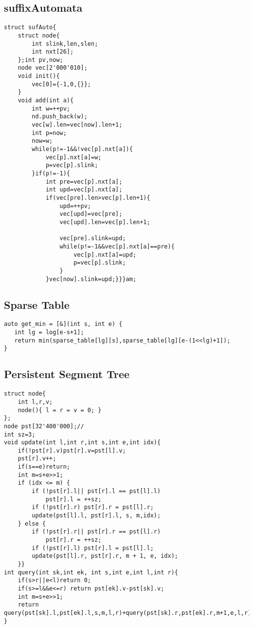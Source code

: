 \documentclass[landscape, 8pt, a4paper, oneside, twocolumn]{extarticle}
\begin{document}
\subsection {suffixAutomata}
\begin{verbatim}
struct sufAuto{
    struct node{
        int slink,len,slen;
        int nxt[26];
    };int pv,now;
    node vec[2'000'010];
    void init(){
        vec[0]={-1,0,{}};
    }
    void add(int a){
        int w=++pv;
        nd.push_back(w);
        vec[w].len=vec[now].len+1;
        int p=now;
        now=w;
        while(p!=-1&&!vec[p].nxt[a]){
            vec[p].nxt[a]=w;
            p=vec[p].slink;
        }if(p!=-1){
            int pre=vec[p].nxt[a];
            int upd=vec[p].nxt[a];
            if(vec[pre].len>vec[p].len+1){
                upd=++pv;
                vec[upd]=vec[pre];
                vec[upd].len=vec[p].len+1;

                vec[pre].slink=upd;
                while(p!=-1&&vec[p].nxt[a]==pre){
                    vec[p].nxt[a]=upd;
                    p=vec[p].slink;
                }
            }vec[now].slink=upd;}}}am;
\end{verbatim}

\subsection {Sparse Table}
\begin{verbatim}
auto get_min = [&](int s, int e) {
   int lg = log[e-s+1];
   return min(sparse_table[lg][s],sparse_table[lg][e-(1<<lg)+1]);
}
\end{verbatim}
\subsection {Persistent Segment Tree}
\begin{verbatim}
struct node{
    int l,r,v;
    node(){ l = r = v = 0; }
};
node pst[32'400'000];//
int sz=3;
void update(int l,int r,int s,int e,int idx){
    if(!pst[r].v)pst[r].v=pst[l].v;
    pst[r].v++;
    if(s==e)return;
    int m=s+e>>1;
    if (idx <= m) {
        if (!pst[r].l|| pst[r].l == pst[l].l)
            pst[r].l = ++sz;
        if (!pst[r].r) pst[r].r = pst[l].r;
        update(pst[l].l, pst[r].l, s, m,idx);
    } else {
        if (!pst[r].r|| pst[r].r == pst[l].r)
            pst[r].r = ++sz;
        if (!pst[r].l) pst[r].l = pst[l].l;
        update(pst[l].r, pst[r].r, m + 1, e, idx);
    }}
int query(int sk,int ek, int s,int e,int l,int r){
    if(s>r||e<l)return 0;
    if(s>=l&&e<=r) return pst[ek].v-pst[sk].v;
    int m=s+e>>1;
    return query(pst[sk].l,pst[ek].l,s,m,l,r)+query(pst[sk].r,pst[ek].r,m+1,e,l,r);
}
\end{verbatim}
\end{document}
